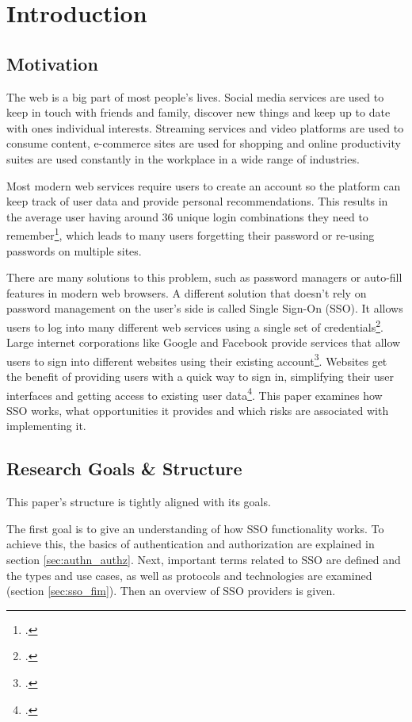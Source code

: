 \section{Introduction}

\subsection{Motivation}

The web is a big part of most people's lives. 
Social media services are used to keep in touch with friends and family,
discover new things and keep up to date with ones individual interests.
Streaming services and video platforms are used to consume content,
e-commerce sites are used for shopping and
online productivity suites are used constantly in the workplace in a wide
range of industries.

Most modern web services require users to create an account so the platform
can keep track of user data and provide personal recommendations.
This results in the average user having around 36 unique login combinations they need to remember\footcite[Cp.][p. 4]{Florencio2006},
which leads to many users forgetting their password or re-using passwords on multiple sites.

There are many solutions to this problem, such as password managers or auto-fill features in modern web browsers.
A different solution that doesn't rely on password management on the user's side is called Single Sign-On (SSO).
It allows users to log into many different web services using a single set of credentials\footcite[Cp.][134]{Radha2012}.
Large internet corporations like Google and Facebook provide services that allow users to sign into
different websites using their existing account\footcite[Cp.][p. 2]{Gafni2014}.
Websites get the benefit of providing users with a quick way to sign in, simplifying their user interfaces
and getting access to existing user data\footcite[Cp.][]{GoogleSignIn2022}.
This paper examines how \ac{SSO} works, what opportunities it provides and which risks are associated with implementing it.

\subsection{Research Goals \& Structure}

This paper's structure is tightly aligned with its goals.

The first goal is to give an understanding of how \ac{SSO} functionality works.
To achieve this, the basics of authentication and authorization are explained in section \ref{sec:authn_authz}.
Next, important terms related to \ac{SSO} are defined and the types and use cases,
as well as protocols and technologies are examined (section \ref{sec:sso_fim}). Then an overview of \ac{SSO} providers is given.

